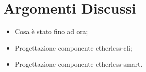 \section{Argomenti Discussi}
	\begin{itemize}
		\item Cosa è stato fino ad ora;
		\item Progettazione componente etherless-cli;
		\item Progettazione componente etherless-smart.
	\end{itemize}